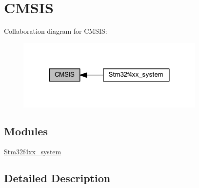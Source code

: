 \hypertarget{group___c_m_s_i_s}{}\section{C\+M\+S\+IS}
\label{group___c_m_s_i_s}
Collaboration diagram for C\+M\+S\+IS\+:
\nopagebreak
\begin{figure}[H]
\begin{center}
\leavevmode
\includegraphics[width=264pt]{group___c_m_s_i_s}
\end{center}
\end{figure}
\subsection*{Modules}
\begin{DoxyCompactItemize}
\item 
\mbox{\hyperlink{group__stm32f4xx__system}{Stm32f4xx\+\_\+system}}
\end{DoxyCompactItemize}


\subsection{Detailed Description}
